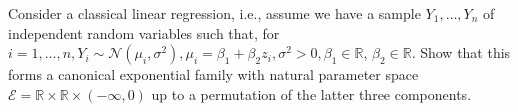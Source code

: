 \begin{exercise}
    Consider a classical linear regression, i.e., assume we have a sample \(Y_{1}, \ldots, Y_{n}\) of independent random variables such that, for \(i=1, \ldots, n, Y_{i} \sim \mathcal{N}\left(\mu_{i}, \sigma^{2}\right), \mu_{i}=\beta_{1}+\beta_{2} z_{i}, \sigma^{2}>0, \beta_{1} \in \mathbb{R}\), \(\beta_{2} \in \mathbb{R}\). Show that this forms a canonical exponential family with natural parameter space \(\mathcal{E}=\mathbb{R} \times \mathbb{R} \times(-\infty, 0)\) up to a permutation of the latter three components.
\end{exercise}